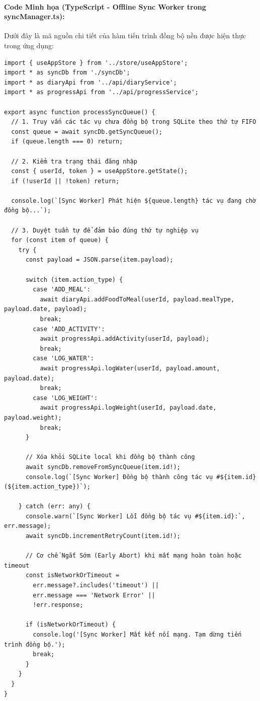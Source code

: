 \documentclass[12pt,a4paper]{article}
\begin{document}
\paragraph{Code Minh họa (TypeScript - Offline Sync Worker trong syncManager.ts):}
Dưới đây là mã nguồn chi tiết của hàm tiến trình đồng bộ nền được hiện thực trong ứng dụng:
\begin{verbatim}
import { useAppStore } from '../store/useAppStore';
import * as syncDb from './syncDb';
import * as diaryApi from '../api/diaryService';
import * as progressApi from '../api/progressService';

export async function processSyncQueue() {
  // 1. Truy vấn các tác vụ chưa đồng bộ trong SQLite theo thứ tự FIFO
  const queue = await syncDb.getSyncQueue();
  if (queue.length === 0) return;

  // 2. Kiểm tra trạng thái đăng nhập
  const { userId, token } = useAppStore.getState();
  if (!userId || !token) return;

  console.log(`[Sync Worker] Phát hiện ${queue.length} tác vụ đang chờ đồng bộ...`);

  // 3. Duyệt tuần tự để đảm bảo đúng thứ tự nghiệp vụ
  for (const item of queue) {
    try {
      const payload = JSON.parse(item.payload);
      
      switch (item.action_type) {
        case 'ADD_MEAL':
          await diaryApi.addFoodToMeal(userId, payload.mealType, payload.date, payload);
          break;
        case 'ADD_ACTIVITY':
          await progressApi.addActivity(userId, payload);
          break;
        case 'LOG_WATER':
          await progressApi.logWater(userId, payload.amount, payload.date);
          break;
        case 'LOG_WEIGHT':
          await progressApi.logWeight(userId, payload.date, payload.weight);
          break;
      }
      
      // Xóa khỏi SQLite local khi đồng bộ thành công
      await syncDb.removeFromSyncQueue(item.id!);
      console.log(`[Sync Worker] Đồng bộ thành công tác vụ #${item.id} (${item.action_type})`);
      
    } catch (err: any) {
      console.warn(`[Sync Worker] Lỗi đồng bộ tác vụ #${item.id}:`, err.message);
      await syncDb.incrementRetryCount(item.id!);

      // Cơ chế Ngắt Sớm (Early Abort) khi mất mạng hoàn toàn hoặc timeout
      const isNetworkOrTimeout = 
        err.message?.includes('timeout') || 
        err.message === 'Network Error' || 
        !err.response;
        
      if (isNetworkOrTimeout) {
        console.log('[Sync Worker] Mất kết nối mạng. Tạm dừng tiến trình đồng bộ.');
        break;
      }
    }
  }
}
\end{verbatim}
\end{document}
